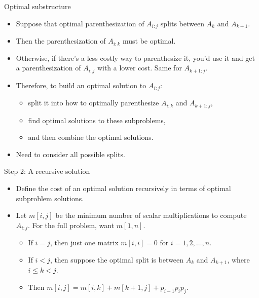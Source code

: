 \documentclass[aspectratio=169]{beamer}
\begin{document}
\begin{frame}{Optimal substructure}
    \begin{itemize}
        \item Suppose that optimal parenthesization of $A_{i:j}$ splits between $A_k$ and $A_{k+1}$.
        \item Then the parenthesization of $A_{i:k}$ must be optimal.
        \item Otherwise, if there's a less costly way to parenthesize it, you'd use it and get a parenthesization of $A_{i:j}$ with a lower cost. Same for $A_{k+1:j}$.
        \item Therefore, to build an optimal solution to $A_{i:j}$:
            \begin{itemize}
                \item split it into how to optimally parenthesize $A_{i:k}$ and $A_{k+1:j}$,
                \item find optimal solutions to these subproblems,
                \item and then combine the optimal solutions.
            \end{itemize}
        \item Need to consider all possible splits.
    \end{itemize}
\end{frame}

\begin{frame}{Step 2: A recursive solution}
    \begin{itemize}
        \item Define the cost of an optimal solution recursively in terms of optimal subproblem solutions.
        \item Let $m[i, j]$ be the minimum number of scalar multiplications to compute $A_{i:j}$. For the full problem, want $m[1, n]$.
        \begin{itemize}
            \item If $i = j$, then just one matrix $ m[i, i] = 0$ for $i = 1, 2, \ldots, n$.
            \item If $i < j$, then suppose the optimal split is between $A_k$ and $A_{k+1}$, where $i \leq k < j$.
            \item Then $m[i, j] = m[i, k] + m[k+1, j] + p_{i-1} p_i p_j$.
        \end{itemize}
    \end{itemize}
\end{frame}
\end{document}
